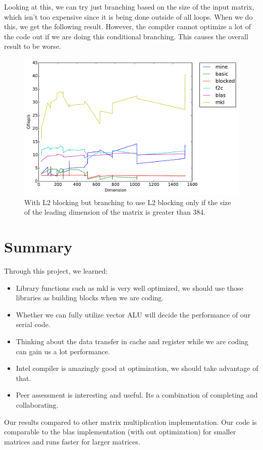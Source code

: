 \documentclass[11pt]{article}
\begin{document}
        Looking at this, we can try just branching based on the size of the input matrix, which isn't too expensive since it is being done outside of all loops. When we do this, we get the following result. However, the compiler cannot optimize a lot of the code out if we are doing this conditional branching. This causes the overall result to be worse.
        \begin{figure}[H]
            \centering
            \includegraphics[width=4.5in]{timing_L2_2.pdf}
            \caption{With L2 blocking but branching to use L2 blocking only if the size of the leading dimension of the matrix is greater than 384.}
        \end{figure}

        \clearpage
    \section{Summary}
        
    Through this project, we learned:
    \begin{itemize}
        \item Library functions such as mkl is very well optimized, we should use those libraries as building blocks when we are coding.
        \item Whether we can fully utilize vector ALU will decide the performance of our serial code.
        \item Thinking about the data transfer in cache and register while we are coding can gain us a lot performance.
        \item Intel compiler is amazingly good at optimization, we should take advantage of that.
        \item Peer assessment is interesting and useful. Its a combination of completing and collaborating.
    \end{itemize}

    Our results compared to other matrix multiplication implementation. Our code is comparable to the blas implementation (with out optimization) for smaller matrices and runs faster for larger matrices.
\end{document}
